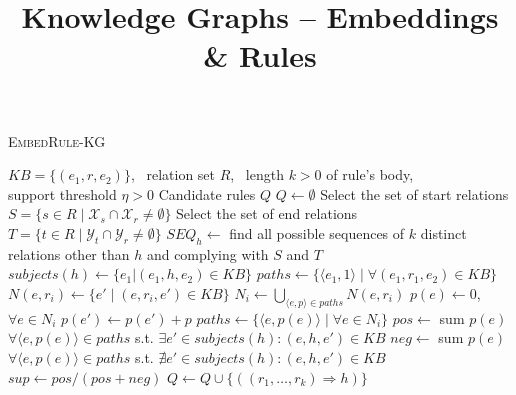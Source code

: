 \documentclass[a4paper,9pt]{article}
\begin{document}
\title{Knowledge Graphs -- Embeddings \& Rules}


\author{\vspace{10mm}}

\maketitle 



\begin{algorithm}[h!]
\caption{\textsc{EmbedRule-KG}}
\label{alg:embedrulekg}
\begin{algorithmic}[1]
\small
\REQUIRE $KB = \{(e_1,r, e_2)\}$, \ relation set $R$, \ length $k > 0$ of rule's body,\  \\  support threshold $\eta > 0$
\ENSURE Candidate rules $Q$
\STATE $Q \gets \emptyset$
	\STATE Select the set of start relations $S = \{s \in R \mid \mathcal{X}_s \cap \mathcal{X}_r \neq \emptyset\}$
	\STATE Select the set of end relations $T = \{t \in R \mid \mathcal{Y}_t \cap \mathcal{Y}_r \neq \emptyset\}$
	\STATE $SEQ_h \gets $ find all possible sequences of $k$ distinct relations other than $h$ and complying with $S$ and $T$ 
	\vspace{1mm}
	\\
	\STATE $subjects(h) \gets \{e_1 | (e_1,h,e_2) \in KB\}$
		\STATE $paths \gets \{\langle e_1, 1 \rangle \mid \forall(e_1,r_1,e_2) \in KB \}$
				\STATE $N(e,r_i) \gets \{e' \mid (e,r_i,e') \in KB\}$\hfill{}
			\ENDFOR
			\STATE $N_i \gets \bigcup_{\langle e, p\rangle \in paths} N(e,r_i) $
			\STATE $p(e) \gets 0$, \ $\forall e \in N_i$
				\STATE $p(e') \gets p(e') + p$
			\ENDFOR
			\STATE $paths \gets \{\langle e, p(e) \rangle \mid \forall e \in N_i \}$
		\ENDFOR
			\STATE $pos \gets $ sum $p(e)$ $\forall \langle e, p(e) \rangle \in paths$ s.t. $\exists e' \in subjects(h) : (e,h,e') \in KB$
			\STATE $neg \gets $ sum $p(e)$ $\forall \langle e, p(e) \rangle \in paths$ s.t. $\nexists e' \in subjects(h) : (e,h,e') \in KB$
			\STATE $sup \gets pos/(pos+neg)$
				\STATE $Q \gets Q \cup \{((r_1, \ldots, r_k) \Rightarrow h)\}$
			\ENDIF
		\ENDIF 
	\ENDFOR
\ENDFOR
\end{algorithmic}
\end{algorithm}
\end{document}
